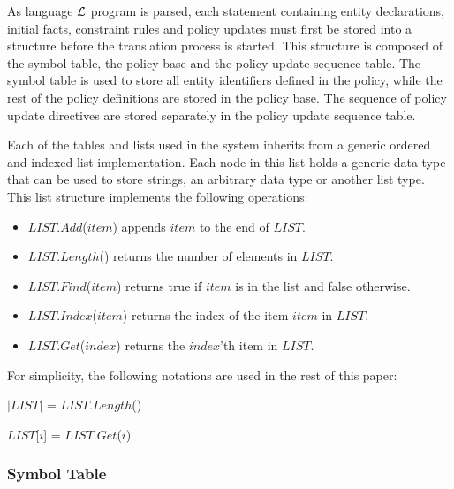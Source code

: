 \documentclass[11pt]{report}
\newenvironment{vquote}
{
  \begin{list}{}{\leftmargin 1em}\item[]
}
{
  \end{list}
}
\begin{document}
        As language ${\cal L}$ program is parsed, each statement containing
        entity declarations, initial facts, constraint rules and policy
        updates must first be stored into a structure before the translation
        process is started. This structure is composed of the symbol table,
        the policy base and the policy update sequence table. The symbol table
        is used to store all entity identifiers defined in the policy, while
        the rest of the policy definitions are stored in the policy base. The
        sequence of policy update directives are stored separately in the
        policy update sequence table.

        Each of the tables and lists used in the system inherits from a generic
        ordered and indexed list implementation. Each node in this list holds a
        generic data type that can be used to store strings, an arbitrary data
        type or another list type. This list structure implements the following
        operations:

        \begin{itemize}
          \item
            $LIST$.$Add$($item$) appends $item$ to the end of $LIST$.
          \item
            $LIST$.$Length$() returns the number of elements in $LIST$.

          \item
            $LIST$.$Find$($item$) returns true if $item$ is in the list and
            false otherwise.

          \item
            $LIST$.$Index$($item$) returns the index of the item $item$
            in $LIST$.

          \item
            $LIST$.$Get$($index$) returns the $index$'th item in $LIST$.
        \end{itemize}

        \noindent
        For simplicity, the following notations are used in the rest of this
        paper:

        \begin{vquote}
          $|LIST|$ = $LIST$.$Length$()

          $LIST$[$i$] = $LIST$.$Get$($i$)
        \end{vquote}

        \subsubsection{Symbol Table}
\end{document}
